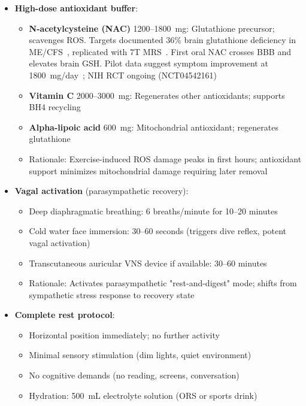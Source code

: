 \begin{itemize}
    \item \textbf{High-dose antioxidant buffer}:
    \begin{itemize}
        \item \textbf{N-acetylcysteine (NAC)} 1200--1800~mg: Glutathione precursor; scavenges ROS. Targets documented 36\% brain glutathione deficiency in ME/CFS~\cite{Shungu2012glutathione}, replicated with 7T MRS~\cite{Godlewska2021glutathione}. First oral NAC crosses BBB and elevates brain GSH. Pilot data suggest symptom improvement at 1800~mg/day~\cite{Shungu2016NACtrial}; NIH RCT ongoing (NCT04542161)
        \item \textbf{Vitamin C} 2000--3000~mg: Regenerates other antioxidants; supports BH4 recycling
        \item \textbf{Alpha-lipoic acid} 600~mg: Mitochondrial antioxidant; regenerates glutathione
        \item Rationale: Exercise-induced ROS damage peaks in first hours; antioxidant support minimizes mitochondrial damage requiring later removal
    \end{itemize}

    \item \textbf{Vagal activation} (parasympathetic recovery):
    \begin{itemize}
        \item Deep diaphragmatic breathing: 6 breaths/minute for 10--20 minutes
        \item Cold water face immersion: 30--60 seconds (triggers dive reflex, potent vagal activation)
        \item Transcutaneous auricular VNS device if available: 30--60 minutes
        \item Rationale: Activates parasympathetic "rest-and-digest" mode; shifts from sympathetic stress response to recovery state
    \end{itemize}

    \item \textbf{Complete rest protocol}:
    \begin{itemize}
        \item Horizontal position immediately; no further activity
        \item Minimal sensory stimulation (dim lights, quiet environment)
        \item No cognitive demands (no reading, screens, conversation)
        \item Hydration: 500~mL electrolyte solution (ORS or sports drink)
    \end{itemize}
\end{itemize}

